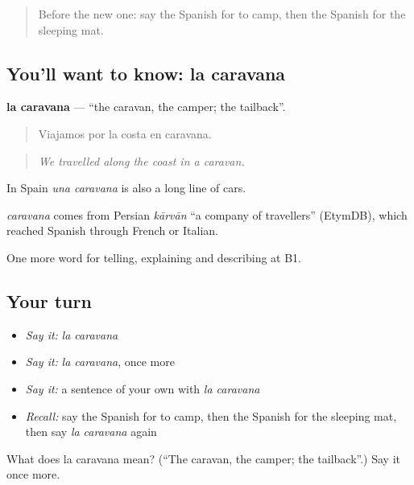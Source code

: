 \begin{quote}
Before the new one: say the Spanish for to camp, then the Spanish for the sleeping mat.
\end{quote}

\subsection*{You'll want to know: la caravana}
\textbf{la caravana} — \textquotedblleft{}the caravan, the camper; the tailback\textquotedblright{}.

\begin{quote}
Viajamos por la costa en caravana.
\end{quote}

\begin{quote}
\emph{We travelled along the coast in a caravan.}
\end{quote}

In Spain \emph{una caravana} is also a long line of cars.

\begin{cousinweb}
\emph{caravana} comes from Persian \emph{kārvān} \textquotedblleft{}a company of travellers\textquotedblright{} (EtymDB), which reached Spanish through French or Italian.
\end{cousinweb}

\begin{grammarlens}[title={What you've built}]
One more word for telling, explaining and describing at B1.
\end{grammarlens}

\subsection*{Your turn}
\begin{itemize}
\raggedright
  \item \emph{Say it:} \emph{la caravana}
  \item \emph{Say it:} \emph{la caravana}, once more
  \item \emph{Say it:} a sentence of your own with \emph{la caravana}
  \item \emph{Recall:} say the Spanish for to camp, then the Spanish for the sleeping mat, then say \emph{la caravana} again
\end{itemize}

\begin{tcolorbox}[breakable,colback=teal!4,colframe=teal!35!black,title={Before you move on}]
What does la caravana mean? (\textquotedblleft{}The caravan, the camper; the tailback\textquotedblright{}.) Say it once more.
\end{tcolorbox}
